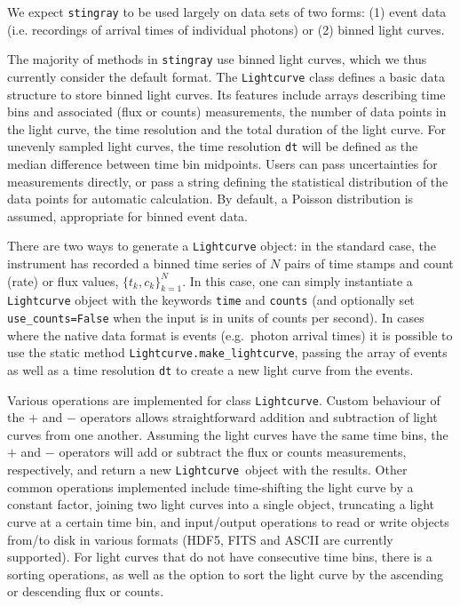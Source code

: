 \documentclass[twocolumn]{aastex62}
\newcommand{\stingray}{\texttt{stingray}\xspace}
\newcommand{\lightcurve}{\texttt{Lightcurve}\xspace}
\begin{document}
We expect \stingray to be used largely on data sets of two forms: (1) event data (i.e. recordings of arrival times of individual photons) or (2) binned light curves. 

The majority of methods in \stingray use binned light curves, which we thus currently consider the default format. The \lightcurve class defines a basic data structure to store binned light curves. Its features include arrays describing time bins and associated (flux or counts) measurements, the number of data points in the light curve, the time resolution and the total duration of the light curve. For unevenly sampled light curves, the time resolution \texttt{dt} will be defined as the median difference between time bin midpoints. Users can pass uncertainties for measurements directly, or pass a string defining the statistical distribution of the data points for automatic calculation. By default, a Poisson distribution is assumed, appropriate for binned event data. 

There are two ways to generate a \texttt{Lightcurve} object: in the standard case, the instrument has recorded a binned time series of $N$ pairs of time stamps and count (rate) or flux values, $\{t_k, c_k \}_{k=1}^{N}$. In this case, one can simply instantiate a \texttt{Lightcurve} object with the keywords \texttt{time} and \texttt{counts} (and optionally set \texttt{use\_counts=False} when the input is in units of counts per second). In cases where the native data format is events (e.g.\ photon arrival times) it is possible to use the static method \texttt{Lightcurve.make\_lightcurve}, passing the array of events as well as a time resolution \texttt{dt} to create a new light curve from the events.

Various operations are implemented for class \lightcurve. Custom behaviour of the $+$ and $-$ operators allows straightforward addition and subtraction of light curves from one another. Assuming the light curves have the same time bins, the $+$ and $-$ operators will add or subtract the flux or counts measurements, respectively, and return a new \lightcurve\ object with the results. Other common operations implemented include time-shifting the light curve by a constant factor, joining two light curves into a single object, truncating a light curve at a certain time bin, and input/output operations to read or write objects from/to disk in various formats (HDF5, FITS and ASCII are currently supported). For light curves that do not have consecutive time bins, there is a sorting operations, as well as the option to sort the light curve by the ascending or descending flux or counts. 
\end{document}
